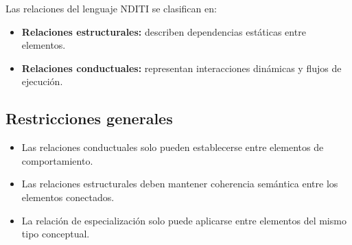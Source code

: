 \noindent
Las relaciones del lenguaje NDITI se clasifican en:

\begin{itemize}
\item \textbf{Relaciones estructurales:} describen dependencias estáticas entre elementos.
\item \textbf{Relaciones conductuales:} representan interacciones dinámicas y flujos de ejecución.
\end{itemize}

\subsection{Restricciones generales}

\begin{itemize}
\item Las relaciones conductuales solo pueden establecerse entre elementos de comportamiento.
\item Las relaciones estructurales deben mantener coherencia semántica entre los elementos conectados.
\item La relación de especialización solo puede aplicarse entre elementos del mismo tipo conceptual.
\end{itemize}
